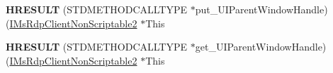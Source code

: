 \begin{DoxyCompactItemize}
\item 
\mbox{\label{struct_m_s_t_s_c_lib_1_1_i_ms_rdp_client_non_scriptable2_vtbl_a139dafdeb2c84eed688bd0d9bded7ec0}} 
{\bfseries H\+R\+E\+S\+U\+LT} (S\+T\+D\+M\+E\+T\+H\+O\+D\+C\+A\+L\+L\+T\+Y\+PE $\ast$put\+\_\+\+U\+I\+Parent\+Window\+Handle)(\hyperlink{interface_m_s_t_s_c_lib_1_1_i_ms_rdp_client_non_scriptable2}{I\+Ms\+Rdp\+Client\+Non\+Scriptable2} $\ast$This
\item 
\mbox{\label{struct_m_s_t_s_c_lib_1_1_i_ms_rdp_client_non_scriptable2_vtbl_aa6d57e92707fe6626bf539740cbf06bb}} 
{\bfseries H\+R\+E\+S\+U\+LT} (S\+T\+D\+M\+E\+T\+H\+O\+D\+C\+A\+L\+L\+T\+Y\+PE $\ast$get\+\_\+\+U\+I\+Parent\+Window\+Handle)(\hyperlink{interface_m_s_t_s_c_lib_1_1_i_ms_rdp_client_non_scriptable2}{I\+Ms\+Rdp\+Client\+Non\+Scriptable2} $\ast$This
\end{DoxyCompactItemize}
